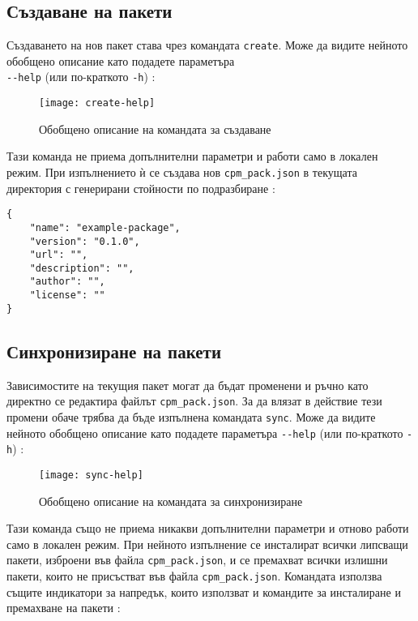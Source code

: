 \subsection{Създаване на пакети}

Създаването на нов пакет става чрез командата \texttt{create}. Може да видите
нейното обобщено описание като подадете параметъра \\
\texttt{-{}-help} (или по-краткото \texttt{-h}) :

\begin{figure}[h]
    \centering
    \texttt{[image: create-help]}
    \caption{Обобщено описание на командата за създаване}
    \label{fig:create-help}
\end{figure}

Тази команда не приема допълнителни параметри и работи само в локален режим.
При изпълнението ѝ се създава нов \texttt{cpm\_pack.json} в текущата директория
с генерирани стойности по подразбиране :


\begin{lstlisting}[style=json,
                   caption=cpm\_pack.json по подразбиране,
                   label={lst:default-cpm-pack-json}]
{
    "name": "example-package",
    "version": "0.1.0",
    "url": "",
    "description": "",
    "author": "",
    "license": ""
}
\end{lstlisting}


\subsection{Синхронизиране на пакети}

Зависимостите на текущия пакет могат да бъдат променени и ръчно като директно се
редактира файлът \texttt{cpm\_pack.json}. За да влязат в действие тези промени
обаче трябва да бъде изпълнена командата \texttt{sync}. Може да видите нейното
обобщено описание като подадете параметъра \texttt{-{}-help} (или по-краткото
\texttt{-h}) :

\begin{figure}[h]
    \centering
    \texttt{[image: sync-help]}
    \caption{Обобщено описание на командата за синхронизиране}
    \label{fig:sync-help}
\end{figure}

Тази команда също не приема никакви допълнителни параметри и отново работи само
в локален режим. При нейното изпълнение се инсталират всички липсващи пакети,
изброени във файла \texttt{cpm\_pack.json}, и се премахват всички излишни
пакети, които не присъстват във файла \texttt{cpm\_pack.json}. Командата
използва същите индикатори за напредък, които използват и командите за
инсталиране и премахване на пакети :

